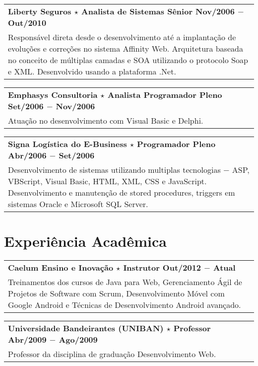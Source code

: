 \documentclass[a4paper, oneside, final]{scrartcl}
\newcommand{\vspc}{\vspace{0.15cm}} %
\begin{document}
\begin{center}
\begin{tabularx}{1\linewidth}{X}
{\bf Liberty Seguros $\star$ Analista de Sistemas Sênior \hfill Nov/2006 $-$ Out/2010} \\
Responsável direta desde o desenvolvimento até a implantação de evoluções e correções no sistema Affinity Web. Arquitetura baseada no conceito de múltiplas camadas e SOA utilizando o protocolo Soap e XML. Desenvolvido usando a plataforma .Net.\vspc\\
\end{tabularx}

\begin{tabularx}{1\linewidth}{X}
{\bf Emphasys Consultoria $\star$ Analista Programador Pleno  \hfill Set/2006 $-$ Nov/2006} \\
Atuação no desenvolvimento com Visual Basic e Delphi. \vspc\\
\end{tabularx}

\begin{tabularx}{1\linewidth}{X}
{\bf Signa Logística do E-Business $\star$ Programador Pleno  \hfill Abr/2006 $-$ Set/2006} \\
Desenvolvimento de sistemas utilizando multiplas tecnologias $-$ ASP, VBScript, Visual Basic, HTML, XML, CSS e JavaScript. Desenvolvimento e manutenção de stored procedures, triggers em sistemas Oracle e Microsoft SQL Server. \vspc\\
\end{tabularx}

\section{Experiência Acadêmica}
\begin{tabularx}{1\linewidth}{X}
{\bf Caelum Ensino e Inovação $\star$ Instrutor  \hfill Out/2012 $-$ Atual} \\
Treinamentos dos cursos de Java para Web, Gerenciamento Ágil de Projetos de Software com Scrum, Desenvolvimento Móvel com Google Android e Técnicas de Desenvolvimento Android avançado. \vspc\\
\end{tabularx}

\begin{tabularx}{1\linewidth}{X}
{\bf Universidade Bandeirantes (UNIBAN) $\star$ Professor \hfill Abr/2009 $-$ Ago/2009} \\
Professor da disciplina de graduação Desenvolvimento Web. \vspc\\
\end{tabularx}


\end{center}
\end{document}
